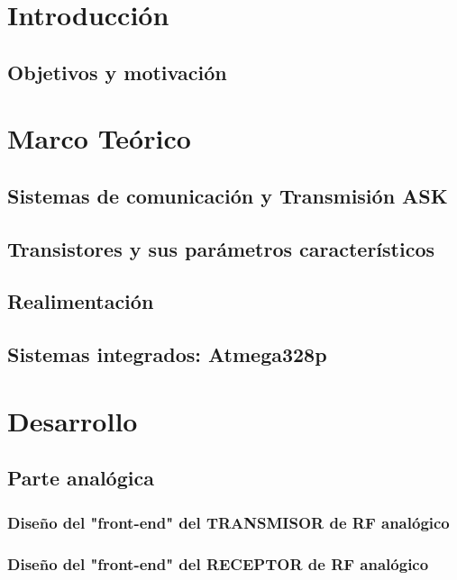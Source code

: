\documentclass[11pt, a4paper]{article} %
\begin{document}
\newpage


\section{Introducción}
   \label{sec:intro}
   
   \subsection{Objetivos y motivaci\'on}
   
\section{Marco Teórico}
   \subsection{Sistemas de comunicaci\'on y Transmisión ASK}
   
   \subsection{Transistores y sus parámetros característicos}
   \label{sec:teo_transistor}
   
   \subsection{Realimentaci\'on}
   \label{sec:teo_osc}
   
   \subsection{Sistemas integrados: Atmega328p}
   
\section{Desarrollo}
   
   \subsection{Parte anal\'ogica}
   
   \subsubsection{Diseño del "front-end" del TRANSMISOR de RF anal\'ogico}
   \label{sec:des_tx}
   
   \subsubsection{Diseño del "front-end" del RECEPTOR de RF anal\'ogico}
   
\end{document}
